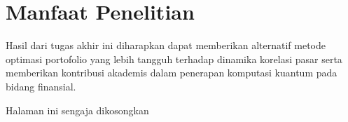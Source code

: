 \section{Manfaat Penelitian}
Hasil dari tugas akhir ini diharapkan dapat memberikan alternatif metode optimasi portofolio yang lebih tangguh terhadap dinamika korelasi pasar serta memberikan kontribusi akademis dalam penerapan komputasi kuantum pada bidang finansial.

\newpage
\thispagestyle{empty}
\vspace*{\fill}
    \begin{center}
	Halaman ini sengaja dikosongkan
    \end{center}
\vspace*{\fill}
\pagebreak
